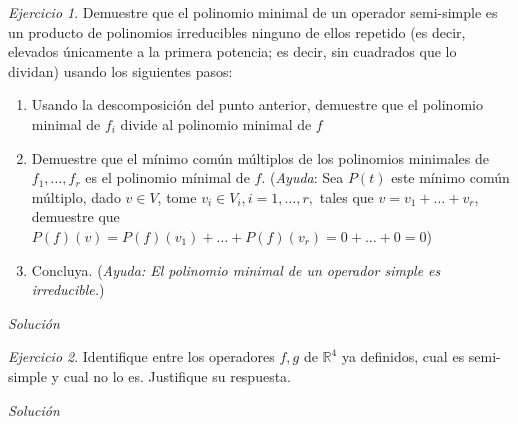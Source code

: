 \documentclass[11pt,a4paper]{article}
\theoremstyle{definition}
\theoremstyle{remark}
\newtheorem{exc}{Ejercicio}
\newcommand{\RR}{\mathbb{R}}
\begin{document}
\begin{exc}
	Demuestre que el polinomio minimal de un operador semi-simple es un producto de polinomios irreducibles ninguno de ellos repetido (es decir, elevados únicamente a la primera potencia; es decir, sin cuadrados que lo dividan) usando los siguientes pasos:
	\begin{enumerate}
		\item Usando la descomposición del punto anterior, demuestre que el polinomio minimal de $ f_i $ divide al polinomio minimal de $ f $
		\item Demuestre que el mínimo común múltiplos de los polinomios minimales de $ f_1, \ldots, f_r $  es el polinomio mínimal de $ f $. (\textit{Ayuda}: Sea $ P(t) $ este mínimo común múltiplo, dado $ v \in V $, tome $ v_i \in V_i, i = 1, \ldots, r, $ tales que $ v = v_1 + \ldots +v_r $, demuestre que $ P(f)(v) = P(f)(v_1) + \ldots + P(f)(v_r) = 0 + \ldots +0 = 0 $)
		\item Concluya. (\textit{Ayuda: El polinomio minimal de un operador simple es irreducible.})
	\end{enumerate}
\end{exc}

\textit{Solución}

\begin{exc}
	Identifique entre los operadores $ f,g $ de $ \RR^4 $ ya definidos, cual es semi-simple y cual no lo es. Justifique su respuesta.
	
\end{exc}

\textit{Solución}
\end{document}
